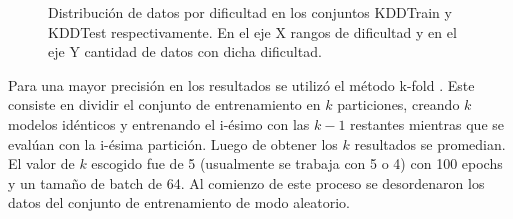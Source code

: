 \begin{figure}
    \centering

    \caption{Distribución de datos por dificultad en los conjuntos KDDTrain y KDDTest respectivamente. En el eje X rangos de dificultad y en el eje Y cantidad de datos con dicha dificultad.}
    \label{fig:diff_distribution}
\end{figure}

Para una mayor precisión en los resultados se utilizó el método k-fold \cite{10.5555/3203489}. Este consiste en dividir el conjunto de entrenamiento en $k$ particiones, creando $k$ modelos idénticos y entrenando el i-\'esimo con las $k - 1$ restantes mientras que se evalúan con la i-\'esima partición. Luego de obtener los $k$ resultados se promedian. El valor de $k$ escogido fue de 5 (usualmente se trabaja con 5 o 4) con 100 epochs y un tamaño de batch de 64. Al comienzo de este proceso se desordenaron los datos del conjunto de entrenamiento de modo aleatorio.

